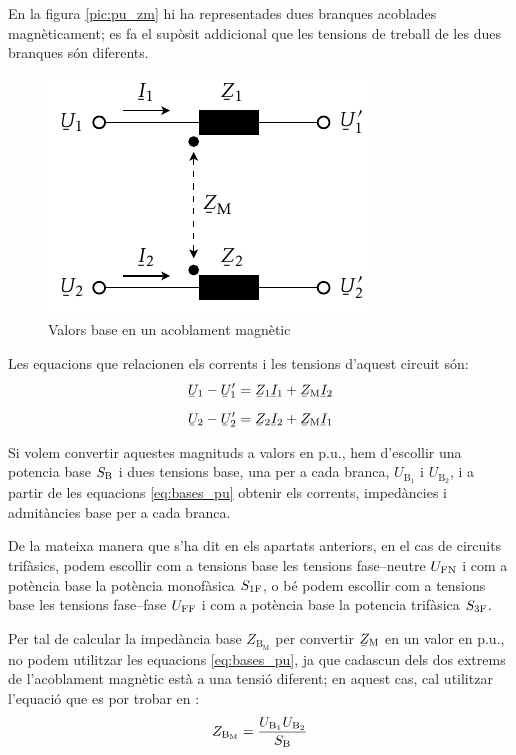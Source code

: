 En la figura \vref{pic:pu_zm} hi ha representades dues branques acoblades magn\`{e}ticament; es fa el sup\`{o}sit addicional que les tensions de treball de les dues branques s\'{o}n diferents.
\begin{figure}[h]
\centering
    \includegraphics{Imatges/Cap-Fonaments-pu-ZM.pdf}
    \caption{Valors base en un acoblament magn\`{e}tic} \label{pic:pu_zm}
\end{figure}

Les equacions que relacionen els corrents i les tensions d'aquest circuit s\'{o}n:
\begin{subequations}
\begin{align}
    \cmplx{U}_1 - \cmplx{U}'_1 &= \cmplx{Z}_1 \cmplx{I}_1 + \cmplx{Z}\ped{M} \cmplx{I}_2   \\[2mm]
    \cmplx{U}_2 - \cmplx{U}'_2 &= \cmplx{Z}_2 \cmplx{I}_2 + \cmplx{Z}\ped{M} \cmplx{I}_1
\end{align}
\end{subequations}

Si volem convertir aquestes magnituds a valors en p.u., hem d'escollir  una potencia base $S_\mathrm{B}$ i dues tensions base, una  per a cada branca, $U_{\text{B}_1}$ i  $U_{\text{B}_2}$, i a partir de les equacions \eqref{eq:bases_pu} obtenir els corrents, imped\`{a}ncies i admit\`{a}ncies base per a cada branca.

De la mateixa manera que s'ha dit en els apartats anteriors, en el cas de circuits trif\`{a}sics, podem escollir com a tensions base les tensions fase--neutre $U_\mathrm{FN}$ i com a pot\`{e}ncia base la pot\`{e}ncia  monof\`{a}sica $S_\mathrm{1F}$, o b\'{e} podem escollir com a tensions base les tensions fase--fase $U_\mathrm{FF}$ i com a pot\`{e}ncia base la potencia trif\`{a}sica $S_\mathrm{3F}$.


Per tal de calcular la imped\`{a}ncia base $Z_{\text{B}_\text{M}}$ per convertir $\cmplx{Z}\ped{M}$ en un valor en p.u., no podem utilitzar les equacions \eqref{eq:bases_pu}, ja que cadascun dels dos extrems de l'acoblament magn\`{e}tic est\`{a} a una tensi\'{o} diferent; en aquest cas, cal utilitzar l'equaci\'{o} que es por trobar en \cite{TLE}:
\begin{equation}
    Z_{\text{B}_\text{M}} = \frac{U_{\text{B}_1} U_{\text{B}_2}} {S_\mathrm{B}}
\end{equation}

